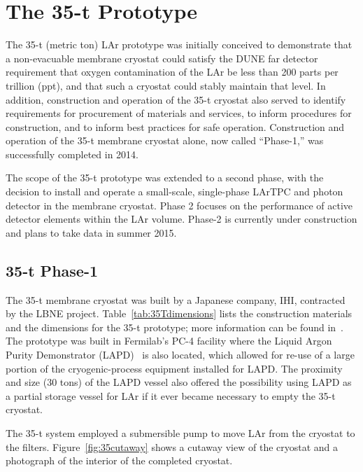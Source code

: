 \section{The 35-t Prototype}
\label{sec:proto-35t}

The 35-t (metric ton) LAr prototype was initially conceived to demonstrate that a non-evacuable
membrane cryostat could satisfy the DUNE far detector requirement that oxygen contamination
of the LAr be less than 200 parts per trillion (ppt), and that such a cryostat
could stably maintain that level.  In addition, construction and operation of the
35-t cryostat also served to identify requirements for procurement of materials and services,
to inform procedures for construction, and to inform best practices for safe operation.
Construction and operation of the 35-t membrane cryostat alone, now called ``Phase-1,''
was successfully completed in 2014.

The scope of the 35-t prototype was extended to a second phase, with the decision to install
and operate a small-scale, single-phase LArTPC and photon detector in the membrane cryostat.
Phase 2 focuses on the performance of active detector elements within the LAr volume.
Phase-2 is currently under construction and plans to take data in summer 2015.

\subsection{35-t Phase-1}

The 35-t membrane cryostat was built by a Japanese company, IHI\cite{bib:ihicorp},
contracted by the LBNE project.  
Table~\ref{tab:35Tdimensions} lists the construction materials and the
dimensions for the 35-t prototype; more information can be found in~\cite{bib:membcryo1573}.
The prototype was built in Fermilab's PC-4 facility where the Liquid Argon Purity
Demonstrator (LAPD)~\cite{bib:lapdP07005} is also located, which allowed for re-use of a large portion
 of the cryogenic-process equipment installed for LAPD.  The proximity and size (30 tons) of the LAPD
 vessel also offered the possibility using LAPD as a partial storage vessel for LAr if it ever
 became necessary to empty the 35-t cryostat.

The 35-t system employed a submersible pump to move LAr from the cryostat to the filters.
Figure~\ref{fig:35cutaway} shows a cutaway view of the cryostat and a photograph of the interior
of the completed cryostat.


